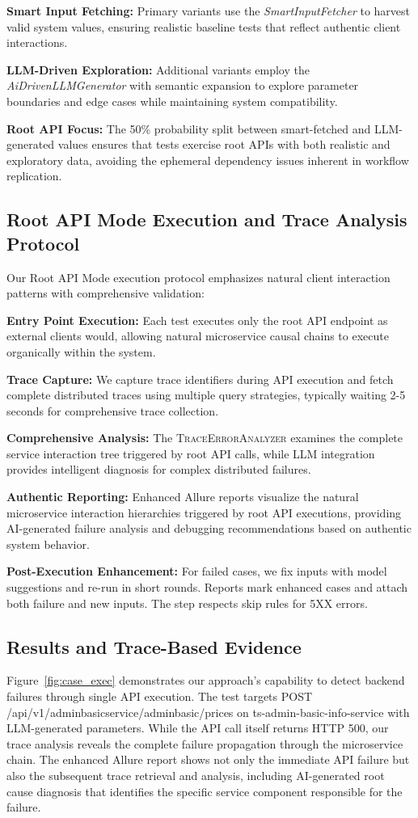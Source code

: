 \documentclass[conference]{IEEEtran}
\begin{document}
\textbf{Smart Input Fetching:} Primary variants use the \emph{SmartInputFetcher} to harvest valid system values, ensuring realistic baseline tests that reflect authentic client interactions.

\textbf{LLM-Driven Exploration:} Additional variants employ the \emph{AiDrivenLLMGenerator} with semantic expansion to explore parameter boundaries and edge cases while maintaining system compatibility.

\textbf{Root API Focus:} The 50\% probability split between smart-fetched and LLM-generated values ensures that tests exercise root APIs with both realistic and exploratory data, avoiding the ephemeral dependency issues inherent in workflow replication.

\subsection{Root API Mode Execution and Trace Analysis Protocol}
Our Root API Mode execution protocol emphasizes natural client interaction patterns with comprehensive validation:

\textbf{Entry Point Execution:} Each test executes only the root API endpoint as external clients would, allowing natural microservice causal chains to execute organically within the system.

\textbf{Trace Capture:} We capture trace identifiers during API execution and fetch complete distributed traces using multiple query strategies, typically waiting 2-5 seconds for comprehensive trace collection.

\textbf{Comprehensive Analysis:} The \textsc{TraceErrorAnalyzer} examines the complete service interaction tree triggered by root API calls, while LLM integration provides intelligent diagnosis for complex distributed failures.

\textbf{Authentic Reporting:} Enhanced Allure reports visualize the natural microservice interaction hierarchies triggered by root API executions, providing AI-generated failure analysis and debugging recommendations based on authentic system behavior.

\textbf{Post-Execution Enhancement:} For failed cases, we fix inputs with model suggestions and re-run in short rounds. Reports mark enhanced cases and attach both failure and new inputs. The step respects skip rules for 5XX errors.

\subsection{Results and Trace-Based Evidence}
Figure~\ref{fig:case_exec} demonstrates our approach's capability to detect backend failures through single API execution. The test targets POST /api\slash v1\slash adminbasicservice\slash adminbasic\slash prices on ts-admin-basic-info-service with LLM-generated parameters. While the API call itself returns HTTP 500, our trace analysis reveals the complete failure propagation through the microservice chain. The enhanced Allure report shows not only the immediate API failure but also the subsequent trace retrieval and analysis, including AI-generated root cause diagnosis that identifies the specific service component responsible for the failure.
\end{document}
